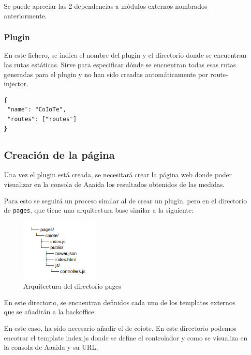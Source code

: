 Se puede apreciar las 2 dependencias a módulos externos nombrados anteriormente. 

\subsubsection{Plugin} 

En este fichero, se indica el nombre del plugin y el directorio donde se encuentran
las rutas estáticas. Sirve para especificar dónde se encuentran todas esas rutas generadas para el plugin y no han sido creadas automáticamente por route-injector. 

\begin{verbatim}
{
 "name": "CoIoTe",
 "routes": ["routes"]
}
\end{verbatim}

\subsection{Creación de la página}

Una vez el plugin está creada, se necesitará crear la página web donde poder visualizar en la consola de Aaaida los resultados obtenidos de las medidas. 

Para esto se seguirá un proceso similar al de crear un plugin, pero en el directorio de \texttt{pages}, que tiene una arquitectura base similar a la siguiente:  

\begin{figure}[htb]
\begin{center}
\includegraphics[width=0.35\textwidth]{./setup/arc2}
\caption{Arquitectura del directorio pages}
\end{center}
\end{figure}


En este directorio, se encuentran definidos cada uno de los templates externos que se añadirán a la backoffice.

En este caso, ha sido necesario añadir el de coiote. En este directorio podemos encotrar el template index.js donde se define el controlador y como se visualiza en la consola de Aaaida y su URL. 

